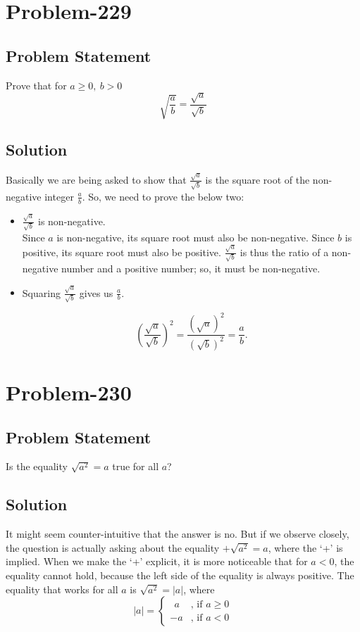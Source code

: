 \documentclass[12pt]{article}
\begin{document}
\section*{Problem-229}
\subsection*{Problem Statement}
Prove that for $a \geq 0,\ b > 0$
\[
	\sqrt{ \frac{a}{b} } = \frac{ \sqrt{a} }{ \sqrt{b} }
\]

\subsection*{Solution}
Basically we are being asked to show that $\frac{ \sqrt{a} }{ \sqrt{b} }$ is the square root of the non-negative integer $\frac{a}{b}$. So, we need to prove the below two:
\begin{itemize}
	\item $\frac{ \sqrt{a} }{ \sqrt{b} }$ is non-negative.\\
	
	Since $a$ is non-negative, its square root must also be non-negative. Since $b$ is positive, its square root must also be positive. $\frac{ \sqrt{a} }{ \sqrt{b} }$ is thus the ratio of a non-negative number and a positive number; so, it must be non-negative.
	\item Squaring $\frac{ \sqrt{a} }{ \sqrt{b} }$ gives us $\frac{a}{b}$.

	\begin{equation*}
			\left( \frac{ \sqrt{a} }{ \sqrt{b} } \right)^2 = \frac{ (\sqrt{a})^2 }{ (\sqrt{b})^2 } = \frac{a}{b}.
	\end{equation*}		
\end{itemize}

\section*{Problem-230}
\subsection*{Problem Statement}
Is the equality $\sqrt{ a^2 } = a$ true for all $a$?

\subsection*{Solution}
It might seem counter-intuitive that the answer is no. But if we observe closely, the question is actually asking about the equality $+\sqrt{ a^2 } = a$, where the `+' is implied. When we make the `+' explicit, it is more noticeable that for $a < 0$, the equality cannot hold, because the left side of the equality is always positive. The  equality that works for all $a$ is $\sqrt{ a^2 } = |a|$, where
\[
	|a| = 
		\begin{cases}
		   \ \ a &\mbox{, if } a \geq 0\\
		   -a &\mbox{, if } a < 0
		\end{cases}
\]
\end{document}
